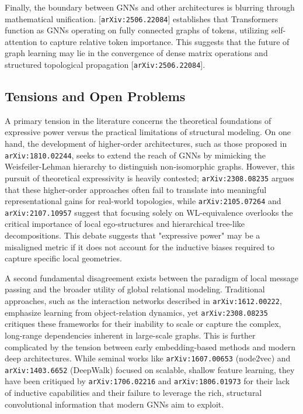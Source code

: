 \documentclass[11pt]{article}
\begin{document}
Finally, the boundary between GNNs and other architectures is blurring through mathematical unification. [\texttt{arXiv:2506.22084}] establishes that Transformers function as GNNs operating on fully connected graphs of tokens, utilizing self-attention to capture relative token importance. This suggests that the future of graph learning may lie in the convergence of dense matrix operations and structured topological propagation [\texttt{arXiv:2506.22084}].

\subsection{Tensions and Open Problems}

A primary tension in the literature concerns the theoretical foundations of expressive power versus the practical limitations of structural modeling. On one hand, the development of higher-order architectures, such as those proposed in \texttt{arXiv:1810.02244}, seeks to extend the reach of GNNs by mimicking the Weisfeiler-Lehman hierarchy to distinguish non-isomorphic graphs. However, this pursuit of theoretical expressivity is heavily contested; \texttt{arXiv:2308.08235} argues that these higher-order approaches often fail to translate into meaningful representational gains for real-world topologies, while \texttt{arXiv:2105.07264} and \texttt{arXiv:2107.10957} suggest that focusing solely on WL-equivalence overlooks the critical importance of local ego-structures and hierarchical tree-like decompositions. This debate suggests that "expressive power" may be a misaligned metric if it does not account for the inductive biases required to capture specific local geometries.

A second fundamental disagreement exists between the paradigm of local message passing and the broader utility of global relational modeling. Traditional approaches, such as the interaction networks described in \texttt{arXiv:1612.00222}, emphasize learning from object-relation dynamics, yet \texttt{arXiv:2308.08235} critiques these frameworks for their inability to scale or capture the complex, long-range dependencies inherent in large-scale graphs. This is further complicated by the tension between early embedding-based methods and modern deep architectures. While seminal works like \texttt{arXiv:1607.00653} (node2vec) and \texttt{arXiv:1403.6652} (DeepWalk) focused on scalable, shallow feature learning, they have been critiqued by \texttt{arXiv:1706.02216} and \texttt{arXiv:1806.01973} for their lack of inductive capabilities and their failure to leverage the rich, structural convolutional information that modern GNNs aim to exploit.
\end{document}
